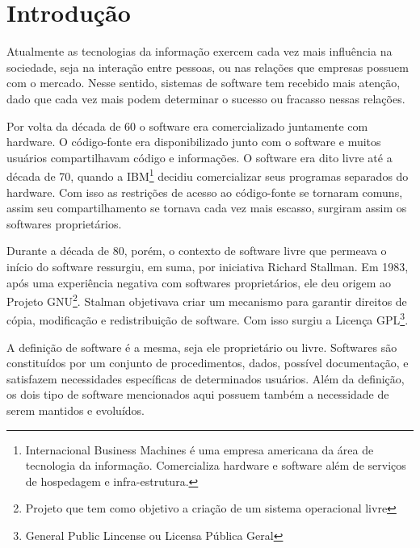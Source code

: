 \chapter{Introdução}

Atualmente as tecnologias da informação exercem cada vez mais influência na sociedade, seja na interação entre pessoas, ou nas relações que empresas possuem com o mercado. Nesse sentido, sistemas de software tem recebido mais atenção, dado que cada vez mais podem determinar o sucesso ou fracasso nessas relações.

Por volta da década de 60 o software era comercializado juntamente com hardware. O código-fonte era disponibilizado junto com o software e muitos usuários compartilhavam código e informações. O software era dito livre até a década de 70, quando a IBM\footnote{Internacional Business Machines é uma empresa americana da área de tecnologia da informação. Comercializa hardware e software além de serviços de hospedagem e infra-estrutura.} decidiu comercializar seus programas separados do hardware. Com isso as restrições de acesso ao código-fonte se tornaram comuns, assim seu compartilhamento se tornava cada vez mais escasso, surgiram assim os softwares proprietários.

Durante a década de 80, porém, o contexto de software livre que permeava o início do software ressurgiu, em suma, por iniciativa Richard Stallman. Em 1983, após uma experiência negativa com softwares proprietários, ele deu origem ao Projeto GNU\footnote{Projeto que tem como objetivo a criação de um sistema operacional livre}. Stalman objetivava criar um mecanismo para garantir direitos de cópia, modificação e redistribuição de software. Com isso surgiu a Licença GPL\footnote{General Public Lincense ou Licensa Pública Geral}.

A definição de software é a mesma, seja ele proprietário ou livre. Softwares são constituídos por um conjunto de procedimentos, dados, possível documentação, e satisfazem necessidades específicas de determinados usuários. Além da definição, os dois tipo de software mencionados aqui possuem também a necessidade de serem mantidos e evoluídos.

